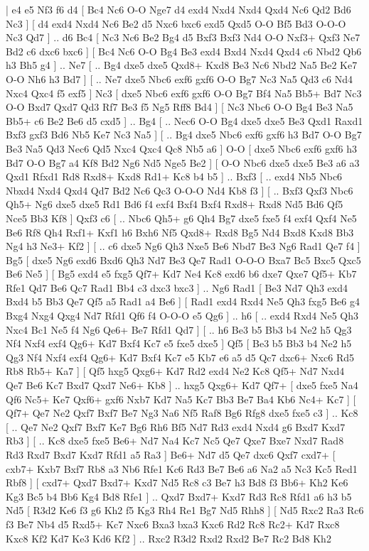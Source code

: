 \makegametitle 
|   e4   e5    Nf3   f6    d4 [  Bc4 Nc6  O-O Nge7  d4 exd4  Nxd4 Nxd4  Qxd4 Nc6  Qd2 Bd6  Nc3   ]  [  d4 exd4  Nxd4 Nc6  Be2 d5  Nxc6 bxc6  exd5 Qxd5  O-O Bf5  Bd3 O-O-O  Nc3 Qd7   ] .. d6    Bc4 [  Nc3 Nc6  Be2 Bg4  d5 Bxf3  Bxf3 Nd4  O-O Nxf3+  Qxf3 Ne7  Bd2 c6  dxc6 bxc6   ]  [  Bc4 Nc6  O-O Bg4  Be3 exd4  Bxd4 Nxd4  Qxd4 c6  Nbd2 Qb6  h3 Bh5  g4   ] .. Ne7 [ .. Bg4  dxe5 dxe5  Qxd8+ Kxd8  Be3 Nc6  Nbd2 Na5  Be2 Ke7  O-O Nh6  h3 Bd7   ]  [ .. Ne7  dxe5 Nbc6  exf6 gxf6  O-O Bg7  Nc3 Na5  Qd3 c6  Nd4 Nxc4  Qxc4 f5  exf5   ]  Nc3 [  dxe5 Nbc6  exf6 gxf6  O-O Bg7  Bf4 Na5  Bb5+ Bd7  Nc3 O-O  Bxd7 Qxd7  Qd3 Rf7  Be3 f5  Ng5 Rff8  Bd4   ]  [  Nc3 Nbc6  O-O Bg4  Be3 Na5  Bb5+ c6  Be2 Be6  d5 cxd5   ] .. Bg4 [ .. Nec6  O-O Bg4  dxe5 dxe5  Be3 Qxd1  Raxd1 Bxf3  gxf3 Bd6  Nb5 Ke7  Nc3 Na5   ]  [ .. Bg4  dxe5 Nbc6  exf6 gxf6  h3 Bd7  O-O Bg7  Be3 Na5  Qd3 Nec6  Qd5 Nxc4  Qxc4 Qc8  Nb5 a6   ]  O-O [  dxe5 Nbc6  exf6 gxf6  h3 Bd7  O-O Bg7  a4 Kf8  Bd2 Ng6  Nd5 Nge5  Be2   ]  [  O-O Nbc6  dxe5 dxe5  Be3 a6  a3 Qxd1  Rfxd1 Rd8  Rxd8+ Kxd8  Rd1+ Kc8  b4 b5   ] .. Bxf3 [ .. exd4  Nb5 Nbc6  Nbxd4 Nxd4  Qxd4 Qd7  Bd2 Nc6  Qc3 O-O-O  Nd4 Kb8  f3   ]  [ .. Bxf3  Qxf3 Nbc6  Qh5+ Ng6  dxe5 dxe5  Rd1 Bd6  f4 exf4  Bxf4 Bxf4  Rxd8+ Rxd8  Nd5 Bd6  Qf5 Nce5  Bb3 Kf8   ]  Qxf3   c6 [ .. Nbc6  Qh5+ g6  Qh4 Bg7  dxe5 fxe5  f4 exf4  Qxf4 Ne5  Be6 Rf8  Qh4 Rxf1+  Kxf1 h6  Bxh6 Nf5  Qxd8+ Rxd8  Bg5 Nd4  Bxd8 Kxd8  Bb3 Ng4  h3 Ne3+  Kf2   ]  [ .. c6  dxe5 Ng6  Qh3 Nxe5  Be6 Nbd7  Be3 Ng6  Rad1 Qe7  f4   ]  Bg5 [  dxe5 Ng6  exd6 Bxd6  Qh3 Nd7  Be3 Qe7  Rad1 O-O-O  Bxa7 Bc5  Bxc5 Qxc5  Be6 Ne5   ]  [  Bg5 exd4  e5 fxg5  Qf7+ Kd7  Ne4 Kc8  exd6 b6  dxe7 Qxe7  Qf5+ Kb7  Rfe1 Qd7  Be6 Qc7  Rad1 Bb4  c3 dxc3  bxc3   ] .. Ng6    Rad1 [  Be3 Nd7  Qh3 exd4  Bxd4 b5  Bb3 Qe7  Qf5 a5  Rad1 a4  Be6   ]  [  Rad1 exd4  Rxd4 Ne5  Qh3 fxg5  Be6 g4  Bxg4 Nxg4  Qxg4 Nd7  Rfd1 Qf6  f4 O-O-O  e5 Qg6   ] .. h6 [ .. exd4  Rxd4 Ne5  Qh3 Nxc4  Bc1 Ne5  f4 Ng6  Qe6+ Be7  Rfd1 Qd7   ]  [ .. h6  Be3 b5  Bb3 b4  Ne2 h5  Qg3 Nf4  Nxf4 exf4  Qg6+ Kd7  Bxf4 Kc7  e5 fxe5  dxe5   ]  Qf5 [  Be3 b5  Bb3 b4  Ne2 h5  Qg3 Nf4  Nxf4 exf4  Qg6+ Kd7  Bxf4 Kc7  e5 Kb7  e6 a5  d5 Qc7  dxc6+ Nxc6  Rd5 Rb8  Rb5+ Ka7   ]  [  Qf5 hxg5  Qxg6+ Kd7  Rd2 exd4  Ne2 Kc8  Qf5+ Nd7  Nxd4 Qe7  Be6 Kc7  Bxd7 Qxd7  Ne6+ Kb8   ] .. hxg5    Qxg6+   Kd7    Qf7+ [  dxe5 fxe5  Na4 Qf6  Nc5+ Ke7  Qxf6+ gxf6  Nxb7 Kd7  Na5 Kc7  Bb3 Be7  Ba4 Kb6  Nc4+ Kc7   ]  [  Qf7+ Qe7  Ne2 Qxf7  Bxf7 Be7  Ng3 Na6  Nf5 Raf8  Bg6 Rfg8  dxe5 fxe5  c3   ] .. Kc8 [ .. Qe7  Ne2 Qxf7  Bxf7 Ke7  Bg6 Rh6  Bf5 Nd7  Rd3 exd4  Nxd4 g6  Bxd7 Kxd7  Rb3   ]  [ .. Kc8  dxe5 fxe5  Be6+ Nd7  Na4 Kc7  Nc5 Qe7  Qxe7 Bxe7  Nxd7 Rad8  Rd3 Rxd7  Bxd7 Kxd7  Rfd1 a5  Ra3   ]  Be6+   Nd7    d5   Qe7    dxc6   Qxf7    cxd7+ [  cxb7+ Kxb7  Bxf7 Rb8  a3 Nb6  Rfe1 Kc6  Rd3 Be7  Be6 a6  Na2 a5  Nc3 Kc5  Red1 Rbf8   ]  [  cxd7+ Qxd7  Bxd7+ Kxd7  Nd5 Rc8  c3 Be7  h3 Bd8  f3 Bb6+  Kh2 Ke6  Kg3 Bc5  b4 Bb6  Kg4 Bd8  Rfe1   ] .. Qxd7    Bxd7+   Kxd7    Rd3   Rc8    Rfd1   a6    h3   b5    Nd5 [  R3d2 Ke6  f3 g6  Kh2 f5  Kg3 Rh4  Re1 Bg7  Nd5 Rhh8   ]  [  Nd5 Rxc2  Ra3 Rc6  f3 Be7  Nb4 d5  Rxd5+ Kc7  Nxc6 Bxa3  bxa3 Kxc6  Rd2 Rc8  Rc2+ Kd7  Rxc8 Kxc8  Kf2 Kd7  Ke3 Kd6  Kf2   ] .. Rxc2    R3d2   Rxd2    Rxd2   Be7    Rc2   Bd8    Kh2 